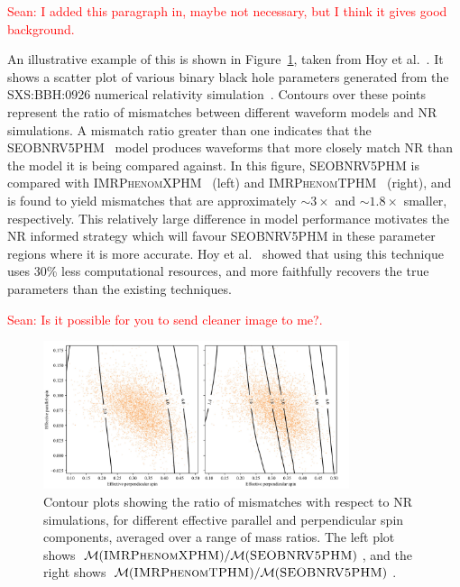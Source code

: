 \documentclass[12pt]{article}
\newcommand{\Sean}[1]{{\textcolor{red}{{Sean: #1}} }}
\begin{document}
\Sean{I added this paragraph in, maybe not necessary, but I think it gives good background.}

%
An illustrative example of this is shown in Figure~\ref{fig:projectmotivation}, taken from Hoy et al.~\cite{Ogpaper}. It shows a scatter plot of various binary black hole parameters generated from the \textsc{SXS:BBH:0926} numerical relativity simulation~\cite{NRsimulation}. 
Contours over these points represent the ratio of mismatches between different waveform models and NR simulations.
A mismatch ratio greater than one indicates that the \textsc{SEOBNRV5PHM}~\cite{bestNRfitS} model produces waveforms that more closely match NR than the model it is being compared against.
In this figure, \textsc{SEOBNRV5PHM} is compared with \textsc{IMRPhenomXPHM}~\cite{NRfitMP} (left) and \textsc{IMRPhenomTPHM}~\cite{NRfitMT} (right), 
and is found to yield mismatches that are approximately \( \sim 3\times \) and \( \sim 1.8\times \) smaller, respectively.
This relatively large difference in model performance motivates the NR informed strategy
which will favour \textsc{SEOBNRV5PHM} in these parameter regions where it is more accurate. 
Hoy et al.~\cite{Ogpaper} showed that using this technique uses 30\% less computational resources, and more faithfully recovers the true parameters than
the existing techniques.
%

\Sean{Is it possible for you to send cleaner image to me?.}
\begin{figure}[H]
    \centering
    \includegraphics[width=0.8\textwidth]{LatexPlots/Sarppaperprojectmotivation.png}
    \caption{Contour plots showing the ratio of mismatches with respect to NR simulations, for different effective parallel and perpendicular spin components, averaged over a range of mass ratios. 
    The left plot shows \( \mathcal{M}(\textsc{IMRPhenomXPHM}) / \mathcal{M}(\textsc{SEOBNRV5PHM}) \), and the right shows \( \mathcal{M}(\textsc{IMRPhenomTPHM}) / \mathcal{M}(\textsc{SEOBNRV5PHM}) \).}
    \label{fig:projectmotivation}
\end{figure}
\end{document}
